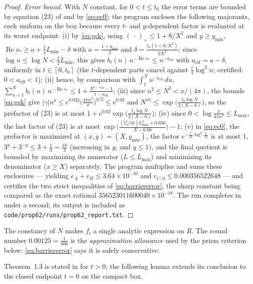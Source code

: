 \documentclass[11pt]{article}
\theoremstyle{definition}
\DeclareMathOperator{\Rea}{Re}
\begin{document}
\begin{proof}
\emph{Error bound.} With $N$ constant, for $0<t\le t_0$ the error
terms are bounded by equation (23) of \cite{Polymath} and by
\eqref{eq:ec0}; the program encloses the following majorants, each
uniform on the box because every $t$- and $y$-dependent factor is
evaluated at its worst endpoint:
(i) by \eqref{eq:gsk}, using $(\,\cdot\,)_+\le1+8/X^2$ and
$y\ge y_{\min}$,
$\Rea s_*\ge a+\frac t4L_{\min}-\delta$ with
$a=\frac{1+y_{\min}}2$ and
$\delta=\frac{t_0(1+8/X^2)}{2X^2}$; since
$\log n\le\log N<\frac12L_{\min}$, this gives
$b_t(n)\,n^{-\Rea s_*}\le n^{-a_{\mathrm{eff}}}$ with
$a_{\mathrm{eff}}=a-\delta$, uniformly in $t\in[0,t_0]$ (the
$t$-dependent parts cancel against $\frac t4\log^2n$; certified:
$0<a_{\mathrm{eff}}<1$);
(ii) hence, by comparison with $\int_1^Nu^{-a_{\mathrm{eff}}}\,du$,
$\sum_{n=1}^{N}b_t(n)\,n^{-\Rea s_*}\le
1+\frac{N^{1-a_{\mathrm{eff}}}-1}{1-a_{\mathrm{eff}}}$;
(iii) since $n^2\le N^2<x/(4\pi)$, the bounds \eqref{eq:gsk} give
$|\gamma|n^y\le e^{0.02y}\bigl(\frac{4\pi n^2}x\bigr)^{y/2}\le
e^{0.02}$ and
$N^{|\kappa|}\le\exp\bigl(\frac{t_0\log N}{2(X-6)}\bigr)$, so the
prefactor of (23) is at most
$1+e^{0.02}\exp\bigl(\frac{t_0\log N}{2(X-6)}\bigr)$;
(iv) since $0<\log\frac x{4\pi n^2}\le L_{\max}$, the last factor
of (23) is at most
$\exp\bigl(\frac{(t_0^2/16)L_{\max}^2+0.626}{X-6.66}\bigr)-1$;
(v) in \eqref{eq:ec0}, the prefactor is maximized at
$(x,y)=(X,y_{\min})$, the factor $e^{-\frac t{16}\log^2\frac x{4\pi}}$
is at most $1$, $3^y+3^{-y}\le3+\frac13=\frac{10}3$ (increasing in
$y$, and $y\le1$), and the final quotient is bounded by maximizing
its numerator ($L\le L_{\max}$) and minimizing its denominator
($x\ge X$) separately.
The program multiplies and sums these enclosures --- yielding
$e_A+e_B\le3.64\times10^{-10}$ and
$e_{C,0}\le0.000356522648$ --- and certifies the two strict
inequalities of \eqref{eq:barriererror}, the sharp constant being
compared as the exact rational $356523011600040\times10^{-18}$.
The run completes in under a second; its output is included as
\texttt{code/prop62/runs/prop62\_report.txt}.
\end{proof}

The constancy of $N$ makes $f_t$ a single analytic
expression on $R$. The round number $0.00125=\frac1{800}$ is the
\emph{approximation allowance} used by the prism criterion below;
\eqref{eq:barriererror} says it is safely conservative.

Theorem~1.3 is stated in \cite{Polymath} for $t>0$; the following
lemma extends its conclusion to the closed endpoint $t=0$ on the
compact box.
\end{document}
